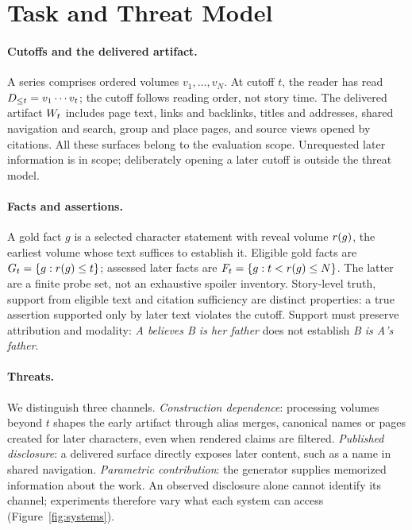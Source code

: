 \section{Task and Threat Model}
\label{sec:task}

\paragraph{Cutoffs and the delivered artifact.}
A series comprises ordered volumes $v_1,\dots,v_N$. At cutoff $t$, the reader has read
$D_{\le t} = v_1 \cdots v_t$; the cutoff follows reading order, not story time. The delivered
artifact $W_t$ includes page text, links and backlinks, titles and addresses, shared
navigation and search, group and place pages, and source views opened by citations. All
these surfaces belong to the evaluation scope. Unrequested later information is in scope; deliberately
opening a later cutoff is outside the threat model.

\paragraph{Facts and assertions.}
A gold fact $g$ is a selected character statement with reveal volume $r(g)$, the earliest
volume whose text suffices to establish it. Eligible gold facts are
$G_t=\{g:r(g)\le t\}$; assessed later facts are
$F_t=\{g: t<r(g)\le N\}$. The latter are a finite probe set, not an exhaustive spoiler
inventory. Story-level truth, support from eligible text and citation sufficiency are
distinct properties: a true assertion supported only by later text violates the cutoff.
Support must preserve attribution and modality: \emph{A believes B is her father} does
not establish \emph{B is A's father}.

\paragraph{Threats.}
We distinguish three channels.
\emph{Construction dependence}: processing volumes beyond $t$ shapes the early artifact
through alias merges, canonical names or pages created for later characters, even when
rendered claims are filtered.
\emph{Published disclosure}: a delivered surface directly exposes later content, such as
a name in shared navigation.
\emph{Parametric contribution}: the generator supplies memorized information about the work.
An observed disclosure alone cannot identify its channel; experiments therefore vary what
each system can access (Figure~\ref{fig:systems}).
